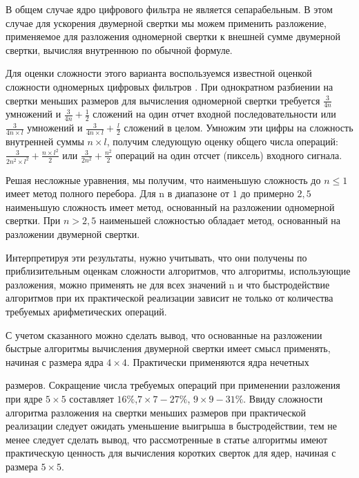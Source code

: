 В общем случае ядро цифрового фильтра не является сепарабельным. В этом случае для ускорения двумерной свертки мы можем применить разложение, применяемое для разложения одномерной свертки \cite{MOU1987377} к внешней сумме двумерной свертки, вычисляя внутреннюю по обычной формуле.

Для оценки сложности этого варианта воспользуемся известной оценкой сложности одномерных цифровых фильтров \cite{haykin2005cocktail}. При однократном разбиении на свертки меньших размеров для вычисления одномерной свертки требуется $\frac{3}{4n}$ умножений и $ \frac{3}{4n}  + \frac{1}{2}$ сложений на один отчет входной последовательности или $\frac{3}{4n \times l}$ умножений и $ \frac{3}{ 4n \times l} +\frac{l}{2}$ сложений в целом. Умножим эти цифры на сложность внутренней суммы $n \times l$, получим
следующую оценку общего числа операций: $\frac{3}{2n^2 \times l^2} +\frac{n \times l^2}{2} $ или $\frac{3}{2n^2} + \frac{n^2}{2}$ операций на один отсчет (пиксель) входного сигнала.

Решая несложные уравнения, мы получим, что наименьшую сложность до $n \leq 1$ имеет метод полного перебора. Для n в диапазоне от $1$ до примерно $2,5$ наименьшую сложность имеет метод, основанный на разложении одномерной свертки. При $n > 2,5$ наименьшей сложностью обладает метод, основанный на разложении двумерной свертки.

Интерпретируя эти результаты, нужно учитывать, что они получены по 
приблизительным оценкам сложности алгоритмов, что алгоритмы, использующие разложения, можно применять не для всех значений n и что быстродействие алгоритмов при их практической реализации зависит не только от количества требуемых арифметических операций.

С учетом сказанного можно сделать вывод, что основанные на разложении быстрые алгоритмы вычисления двумерной свертки имеет смысл применять, начиная с размера ядра $4 \times 4$. Практически применяются ядра нечетных

размеров. Сокращение числа требуемых операций при применении разложения при ядре $5 \times 5$ составляет $16 \%$,$  7 \times 7 - 27 \% $, $9 \times 9 - 31 \%$. Ввиду сложности алгоритма разложения на свертки меньших размеров при практической реализации следует ожидать уменьшение выигрыша в быстродействии, тем
не менее следует сделать вывод, что рассмотренные в статье алгоритмы имеют практическую ценность для вычисления коротких сверток для ядер, начиная с размера $5 \times 5 $.


